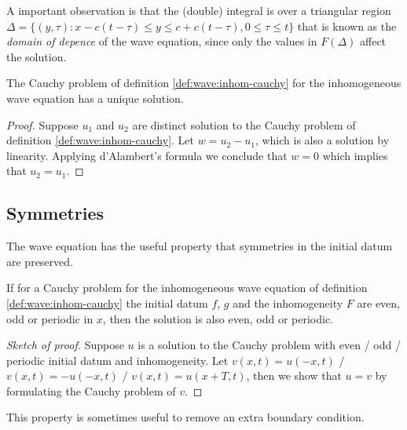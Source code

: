 A important observation is that the (double) integral is over a triangular
region $\Delta = \{ (y,\tau) : x - c(t - \tau) \leq y \leq c + c(t - \tau), 0
\leq \tau \leq t\}$ that is known as the \emph{domain of depence} of the wave
equation, since only the values in $F(\Delta)$ affect the solution.

\begin{thm}[Uniqueness]
  The Cauchy problem of definition \ref{def:wave:inhom-cauchy} for the
  inhomogeneous wave equation has a unique solution.
  \begin{proof}
    Suppose $u_1$ and $u_2$ are distinct solution to the Cauchy problem of
    definition \ref{def:wave:inhom-cauchy}. Let $w = u_2 - u_1$, which is also
    a solution by linearity. Applying d'Alambert's formula we conclude that $w
    = 0$ which implies that $u_2 = u_1$.
  \end{proof}
\end{thm}

\subsection{Symmetries}

The wave equation has the useful property that symmetries in the initial datum
are preserved.

\begin{thm}
  If for a Cauchy problem for the inhomogeneous wave equation of definition
  \ref{def:wave:inhom-cauchy} the initial datum $f$, $g$ and the inhomogeneity
  $F$ are even, odd or periodic in $x$, then the solution is also even, odd or
  periodic.
\end{thm}

\begin{proof}[Sketch of proof]
  Suppose $u$ is a solution to the Cauchy problem with even / odd / periodic
  initial datum and inhomogeneity. Let $v(x,t) = u(-x,t)$ / $v(x,t) =
  -u(-x,t)$ / $v(x,t) = u(x+T,t)$, then we show that $u = v$ by formulating
  the Cauchy problem of $v$.
\end{proof}

This property is sometimes useful to remove an extra boundary condition.
